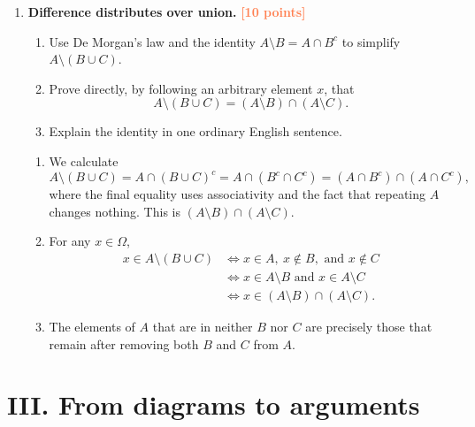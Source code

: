 \documentclass[11pt]{article}
\newcommand{\points}[1]{\hfill\textcolor{coral}{\small\bfseries[#1 points]}}
\begin{document}
\begin{enumerate}[resume]
\item \textbf{Difference distributes over union.} \points{10}
\begin{enumerate}
  \item Use De Morgan's law and the identity $A\setminus B=A\cap B^c$ to
  simplify $A\setminus(B\cup C)$.
  \item Prove directly, by following an arbitrary element $x$, that
  \[
    A\setminus(B\cup C)=(A\setminus B)\cap(A\setminus C).
  \]
  \item Explain the identity in one ordinary English sentence.
\end{enumerate}
\begin{solution}
\begin{enumerate}
  \item We calculate
  \[
  A\setminus(B\cup C)
  =A\cap(B\cup C)^c
  =A\cap(B^c\cap C^c)
  =(A\cap B^c)\cap(A\cap C^c),
  \]
  where the final equality uses associativity and the fact that repeating
  $A$ changes nothing. This is $(A\setminus B)\cap(A\setminus C)$.
  \item For any $x\in\Omega$,
  \begin{align*}
  x\in A\setminus(B\cup C)
  &\iff x\in A,\ x\notin B,\text{ and }x\notin C\\
  &\iff x\in A\setminus B\text{ and }x\in A\setminus C\\
  &\iff x\in(A\setminus B)\cap(A\setminus C).
  \end{align*}
  \item The elements of $A$ that are in neither $B$ nor $C$ are precisely
  those that remain after removing both $B$ and $C$ from $A$.
\end{enumerate}
\end{solution}
\end{enumerate}

\section*{III. From diagrams to arguments}
\end{document}
